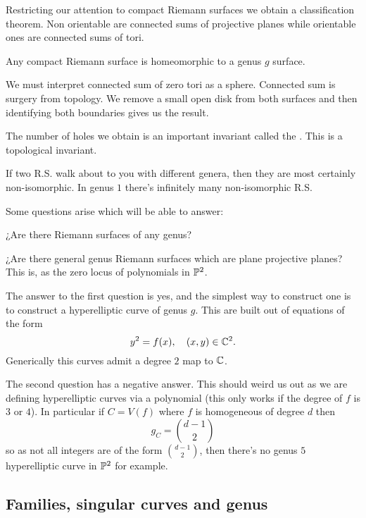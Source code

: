 \documentclass[12pt]{memoir}
\begin{document}
Restricting our attention to compact Riemann surfaces we obtain a classification theorem. Non orientable are connected sums of projective planes while orientable ones are connected sums of tori.

\begin{Cor}
Any compact Riemann surface is homeomorphic to a genus $g$ surface.
\end{Cor}

We must interpret connected sum of zero tori as a sphere. Connected sum is surgery from topology. We remove a small open disk from both surfaces and then identifying both boundaries gives us the result.\par
The number of holes we obtain is an important invariant called the . This is a topological invariant.

\begin{Rmk}
    If two R.S. walk about to you with different genera, then they are most certainly non-isomorphic. In genus $1$ there's infinitely many non-isomorphic R.S.
\end{Rmk}

Some questions arise which will be able to answer:

\begin{Qn}
¿Are there Riemann surfaces of any genus?
\end{Qn}

\begin{Qn}
¿Are there general genus Riemann surfaces which are plane projective planes? This is, as the zero locus of polynomials in $\mathbb{P}^2$.
\end{Qn}

The answer to the first question is yes, and the simplest way to construct one is to construct a hyperelliptic curve of genus $g$. This are built out of equations of the form 
$$y^2=f(x),\quad (x,y)\in\mathbb{C}^2.$$
Generically this curves admit a degree $2$ map to $\mathbb{C}$.\par
The second question has a negative answer. This should weird us out as we are defining hyperelliptic curves via a polynomial (this only works if the degree of $f$ is $3$ or $4$). In particular if $C=V(f)$ where $f$ is homogeneous of degree $d$ then 
$$g_C=\binom{d-1}{2}$$
so as not all integers are of the form $\binom{d-1}{2}$, then there's no genus $5$ hyperelliptic curve in $\mathbb{P}^2$ for example.

\subsection{Families, singular curves and genus}
\end{document}
